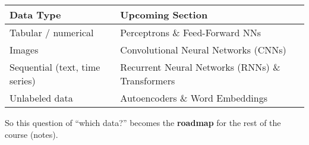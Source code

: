 \begin{table}[!htp]
    \centering
    \begin{tabular}{@{} l p{18em} @{}}
        \toprule
        Data Type & Upcoming Section \\
        \midrule
        Tabular / numerical             & Perceptrons \& Feed-Forward NNs \\[.3em]
        Images                          & Convolutional Neural Networks (CNNs) \\[.3em]
        Sequential (text, time series)  & Recurrent Neural Networks (RNNs) \& Transformers \\
        Unlabeled data                  & Autoencoders \& Word Embeddings \\
        \bottomrule
    \end{tabular}
\end{table}

\noindent
So this question of ``which data?'' becomes the \textbf{roadmap} for the rest of the course (notes).